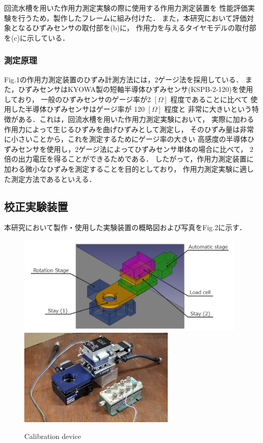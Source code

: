 回流水槽を用いた作用力測定実験の際に使用する作用力測定装置を
性能評価実験を行うため，製作したフレームに組み付けた．
また，本研究において評価対象となるひずみセンサの取付部を(b)に，
作用力を与えるタイヤモデルの取付部を(c)に示している．

\newpage

\subsubsection{測定原理}

Fig.1の作用力測定装置のひずみ計測方法には，2ゲージ法を採用している．
また，ひずみセンサはKYOWA製の短軸半導体ひずみセンサ(KSPB-2-120)を使用しており，
一般のひずみセンサのゲージ率が2 $[\Omega]$ 程度であることに比べて
使用した半導体ひずみセンサはゲージ率が 120 $[\Omega]$ 程度と
非常に大きいという特徴がある．これは，回流水槽を用いた作用力測定実験において，
実際に加わる作用力によって生じるひずみを曲げひずみとして測定し，
そのひずみ量は非常に小さいことから，これを測定するためにゲージ率の大きい
高感度の半導体ひずみセンサを使用し，2ゲージ法によってひずみセンサ単体の場合に比べて，
2倍の出力電圧を得ることができるためである．
したがって，作用力測定装置に加わる微小なひずみを測定することを目的としており，
作用力測定実験に適した測定方法であるといえる．

\subsection{校正実験装置}
本研究において製作・使用した実験装置の概略図および写真をFig.2に示す．

\begin{figure}[htbp]
    \begin{center}
        \includegraphics[width=110mm]{images/22-1.png}
        \includegraphics[width=75mm]{images/22-2.png}
    \end{center}
    \caption{Calibration device}
\end{figure}

